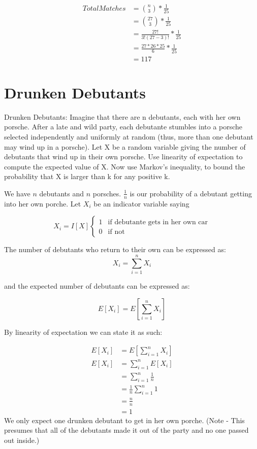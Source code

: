 \documentclass[titlepage]{article}\usepackage[]{graphicx}\usepackage[]{color}
\begin{document}
\begin{align*}
	Total Matches &={n \choose 3} * \frac{1}{25} \\
              &= {27 \choose 3}   * \frac{1}{25} \\
              &=   \frac{27!}{3!(27-3)!} * \frac{1}{25} \\
				&= \frac{27 * 26 * 25}{6} * \frac{1}{25}  \\
				&= 117
\end{align*}



  \section{ Drunken Debutants}
Drunken Debutants: Imagine that there are n debutants, each with her own
porsche. After a late and wild party, each debutante stumbles into a porsche
selected independently and uniformly at random (thus, more than one debutant
may wind up in a porsche). Let X be a random variable giving the number of
debutants that wind up in their own porsche. Use linearity of expectation to
compute the expected value of X. Now use Markov’s inequality, to bound the
probability that X is larger than k for any positive k.

We have $n$ debutants and $n$ porsches. 
$\frac{1}{n}$ is our probability of a debutant getting into her own porche.
Let $X_i$ be an indicator variable saying 

\[
	X_i = I[X]
  \begin{cases}
   1 & \text{if debutante gets in her own car} \\
   0       & \text{if not } 
  \end{cases}
\]

The number of debutants who return to their own can be expressed as:
\[ X_i = \sum_{i=1}^n X_i \]

and the expected number of debutants can be expressed as:

\[ E [X_i] = E \left[ \sum_{i=1}^n X_i \right] \]

By linearity of expectation we can state it as such:

\begin{align*}
	E [X_i] &= E \left[ \sum_{i=1}^n X_i \right] \\
	E [X_i] &=  \sum_{i=1}^n E[X_i] \\ 
	&=  \sum_{i=1}^n \frac{1}{n} \\ 
	&=  \frac{1}{n} \sum_{i=1}^n 1 \\
	&= \frac{n}{n} \\
	& = 1
\end{align*}
We only expect one drunken debutant to get in her own porche. (Note - This presumes
that all of the debutants made it out of the party and no one passed out
inside.)
\end{document}

